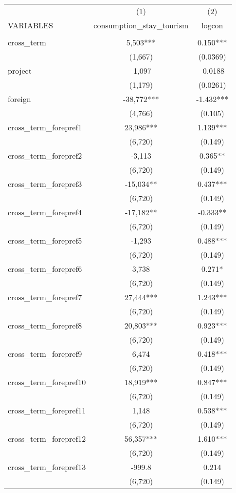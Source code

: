 \documentclass[]{article}
\begin{document}
\begin{tabular}{lcc} \hline
 & (1) & (2) \\
VARIABLES & consumption\_stay\_tourism & logcon \\ \hline
 &  &  \\
cross\_term & 5,503*** & 0.150*** \\
 & (1,667) & (0.0369) \\
project & -1,097 & -0.0188 \\
 & (1,179) & (0.0261) \\
foreign & -38,772*** & -1.432*** \\
 & (4,766) & (0.105) \\
cross\_term\_forepref1 & 23,986*** & 1.139*** \\
 & (6,720) & (0.149) \\
cross\_term\_forepref2 & -3,113 & 0.365** \\
 & (6,720) & (0.149) \\
cross\_term\_forepref3 & -15,034** & 0.437*** \\
 & (6,720) & (0.149) \\
cross\_term\_forepref4 & -17,182** & -0.333** \\
 & (6,720) & (0.149) \\
cross\_term\_forepref5 & -1,293 & 0.488*** \\
 & (6,720) & (0.149) \\
cross\_term\_forepref6 & 3,738 & 0.271* \\
 & (6,720) & (0.149) \\
cross\_term\_forepref7 & 27,444*** & 1.243*** \\
 & (6,720) & (0.149) \\
cross\_term\_forepref8 & 20,803*** & 0.923*** \\
 & (6,720) & (0.149) \\
cross\_term\_forepref9 & 6,474 & 0.418*** \\
 & (6,720) & (0.149) \\
cross\_term\_forepref10 & 18,919*** & 0.847*** \\
 & (6,720) & (0.149) \\
cross\_term\_forepref11 & 1,148 & 0.538*** \\
 & (6,720) & (0.149) \\
cross\_term\_forepref12 & 56,357*** & 1.610*** \\
 & (6,720) & (0.149) \\
cross\_term\_forepref13 & -999.8 & 0.214 \\
 & (6,720) & (0.149) \\

\end{tabular}
\end{document}
